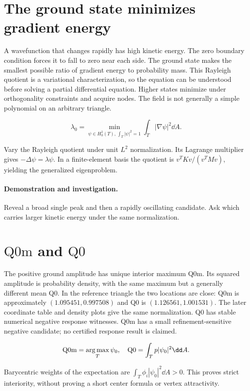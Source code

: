 \documentclass[11pt,oneside,openany]{book}
\newcommand{\argmax}{\operatorname*{arg\,max}}\newcommand{\argmin}{\operatorname*{arg\,min}}
\begin{document}
\section{The ground state minimizes gradient energy}\label{sec:slide48}

A wavefunction that changes rapidly has high kinetic energy. The zero boundary condition forces it to fall to zero near each side. The ground state makes the smallest possible ratio of gradient energy to probability mass. This Rayleigh quotient is a variational characterization, so the equation can be understood before solving a partial differential equation. Higher states minimize under orthogonality constraints and acquire nodes. The field is not generally a simple polynomial on an arbitrary triangle.


\[\lambda_0=\min_{\psi\in H_0^1(T),\,\int_T|\psi|^2=1}\int_T|\nabla\psi|^2\dd A.\]


Vary the Rayleigh quotient under unit $L^2$ normalization.
Its Lagrange multiplier gives $-\Delta\psi=\lambda\psi$.
In a finite-element basis the quotient is $v^TKv/(v^TMv)$,
yielding the generalized eigenproblem.



\paragraph{Demonstration and investigation.} Reveal a broad single peak and then a rapidly oscillating candidate. Ask which carries larger kinetic energy under the same normalization.


\section{$\mathrm{Q0m}$ and $\mathrm{Q0}$}\label{sec:slide49}

The positive ground amplitude has unique interior maximum Q0m.
Its squared amplitude is probability density, with the same maximum
but a generally different mean Q0. In the reference triangle the two
locations are close: Q0m is approximately $(1.095451,0.997508)$ and
Q0 is $(1.126561,1.001531)$. The later coordinate table and density
plots give the same normalization. Q0 has stable numerical negative
response witnesses. Q0m has a small refinement-sensitive negative
candidate; no certified response result is claimed.


\[{\rm Q0m}=\argmax_T\psi_0,\quad {\rm Q0}=\int_Tp|\psi_0|^2\dd A.\]


Barycentric weights of the expectation are
$\int_T\phi_i|\psi_0|^2\dd A>0$. This proves strict interiority,
without proving a short center formula or vertex attractivity.
\end{document}
